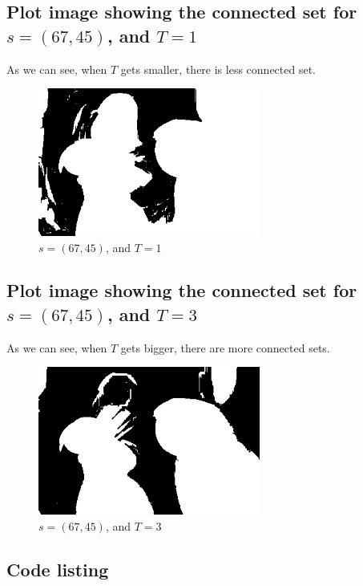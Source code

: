 \documentclass{article}
\begin{document}
\subsection{Plot image showing the connected set for $s=(67,45)$, and $T=1$}
	As we can see, when $T$ gets smaller, there is less connected set.
	\begin{figure}[h]
		\begin{center}
			\includegraphics[width=0.65\textwidth]{img22gd2_af2.png}
			\caption{$s=(67,45)$, and $T=1$}
		\end{center}
	\end{figure}

\pagebreak

\subsection{Plot image showing the connected set for $s=(67,45)$, and $T=3$}
	As we can see, when $T$ gets bigger, there are more connected sets.
	\begin{figure}[h]
		\begin{center}
			\includegraphics[width=0.65\textwidth]{img22gd2_af3.png}
			\caption{$s=(67,45)$, and $T=3$}
		\end{center}
	\end{figure}

\subsection{Code listing}
\end{document}
